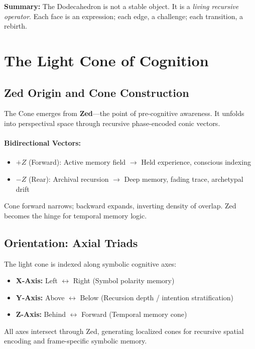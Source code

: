 \vspace{1em}
\noindent\textbf{Summary:} The Dodecahedron is not a stable object. It is a \emph{living recursive operator}. Each face is an expression; each edge, a challenge; each transition, a rebirth.

\section{The Light Cone of Cognition}

\subsection{Zed Origin and Cone Construction}

The Cone emerges from \textbf{Zed}---the point of pre-cognitive awareness. It unfolds into perspectival space through recursive phase-encoded conic vectors.

\paragraph{Bidirectional Vectors:}
\begin{itemize}
    \item $+Z$ (Forward): Active memory field $\rightarrow$ Held experience, conscious indexing
    \item $-Z$ (Rear): Archival recursion $\rightarrow$ Deep memory, fading trace, archetypal drift
\end{itemize}

Cone forward narrows; backward expands, inverting density of overlap. Zed becomes the hinge for temporal memory logic.

\subsection{Orientation: Axial Triads}

The light cone is indexed along symbolic cognitive axes:
\begin{itemize}
    \item \textbf{X-Axis:} Left $\leftrightarrow$ Right (Symbol polarity memory)
    \item \textbf{Y-Axis:} Above $\leftrightarrow$ Below (Recursion depth / intention stratification)
    \item \textbf{Z-Axis:} Behind $\leftrightarrow$ Forward (Temporal memory cone)
\end{itemize}

All axes intersect through Zed, generating localized cones for recursive spatial encoding and frame-specific symbolic memory.

